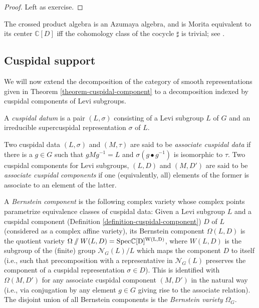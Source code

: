 \begin{proof}
	Left as exercise.
\end{proof}

\begin{remark}
	The crossed product algebra is an Azumaya algebra, and is Morita equivalent to its center $\mathbb C[D]$ iff the cohomology class of the cocycle $\sharp$ is trivial; see \cite[Theorem A.15]{Auslander-Goldman}.
\end{remark}


\subsection{Cuspidal support}

We will now extend the decomposition of the category of smooth representations given in Theorem \ref{theorem-cuspidal-component} to a decomposition indexed by cuspidal components of Levi subgroups.

\begin{definition}
	\label{definition-cuspidal-datum}
A {\it cuspidal datum} is a pair $(L,\sigma)$ consisting of a Levi subgroup $L$ of $G$ and an irreducible supercuspidal representation $\sigma$ of $L$. 

Two cuspidal data $(L,\sigma)$ and $(M,\tau)$ are said to be {\it associate cuspidal data} if there is a $g\in G$ such that $gMg^{-1}=L$ and $\sigma(g\bullet g^{-1})$ is isomorphic to $\tau$. Two cuspidal components for Levi subgroups, $(L,D)$ and $(M,D')$ are said to be {\it associate cuspidal components} if one (equivalently, all) elements of the former is associate to an element of the latter.

A {\it Bernstein component} is the following complex variety whose complex points parametrize equivalence classes of cuspidal data: Given a Levi subgroup $L$ and a cuspidal component (Definition \ref{definition-cuspidal-component}) $D$ of $L$ (considered as a complex affine variety), its Bernstein component $\Omega(L,D)$ is the quotient variety $\Omega\sslash W(L,D) = \rm{Spec} \mathbb C[D]^{W(L,D)}$, where $W(L,D)$ is the subgroup of the (finite) group $\mathcal N_G(L)/L$ which maps the component $D$ to itself (i.e., such that precomposition with a representative in $\mathcal N_G(L)$ preserves the component of a cuspidal representation $\sigma\in D$). This is identified with $\Omega(M,D')$ for any associate cuspidal component $(M,D')$ in the natural way (i.e., via conjugation by any element $g\in G$ giving rise to the associate relation). The disjoint union of all Bernstein components is the {\it Bernstein variety} $\Omega_G$.
\end{definition}

